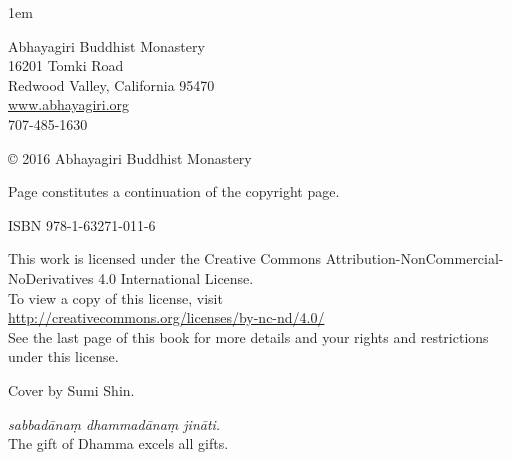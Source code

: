 \thispagestyle{empty}
{\raggedright\small
\parindent 0pt
\parskip 1em

Abhayagiri Buddhist Monastery\\
16201 Tomki Road\\
Redwood Valley, California 95470\\
\href{http://www.abhayagiri.org}{www.abhayagiri.org}\\
707-485-1630

© 2016 Abhayagiri Buddhist Monastery

Page \pageref{credits} constitutes a continuation of the copyright page.

ISBN 978-1-63271-011-6

This work is licensed under the Creative Commons
Attribution-NonCommercial-NoDerivatives 4.0 International License.\\
To view a copy of this license, visit\\
\href{http://creativecommons.org/licenses/by-nc-nd/4.0}
{http://creativecommons.org/licenses/by-nc-nd/4.0/}\\[.5em]
See the last page of this book for more details and your rights and
restrictions under this license.

Cover by Sumi Shin.

\emph{sabbadānaṃ dhammadānaṃ jināti.}\\
The gift of Dhamma excels all gifts.

}
\clearpage
